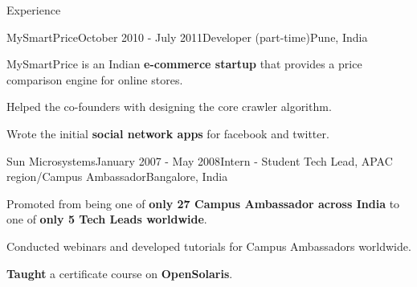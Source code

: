 \documentclass{resume} %
\begin{document}
\begin{rSection}{Experience}
\begin{rSubsection}{MySmartPrice}{October 2010 - July 2011}{Developer (part-time)}{Pune, India}
\item MySmartPrice is an Indian \textbf{e-commerce startup} that provides a price comparison engine for online stores. 
\begin{lsubSubsection}
\item Helped the co-founders with designing the core crawler algorithm. 
\item Wrote the initial \textbf{social network apps} for facebook and twitter.
\end{lsubSubsection}
\end{rSubsection}

\begin{rSubsection}{Sun Microsystems}{January 2007 - May 2008}{Intern - Student Tech Lead, APAC region/Campus Ambassador}{Bangalore, India}
\item Promoted from being one of \textbf{only 27 Campus Ambassador across India} to one of \textbf{only 5 Tech Leads worldwide}.
\begin{lsubSubsection}
\item Conducted webinars and developed tutorials for Campus Ambassadors worldwide.
\item \textbf{Taught} a certificate course on \textbf{OpenSolaris}.
\end{lsubSubsection}
\end{rSubsection}
\end{rSection}
\end{document}
